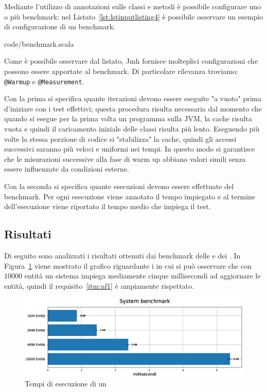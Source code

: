 Mediante l'utilizzo di annotazioni sulle classi e metodi è possibile configurare uno o più benchmark: nel
Listato~\ref{lst:lstinputlisting4} è possibile osservare un esempio di configurazione di un benchmark.


{code/benchmark.scala}

Come è possibile osservare dal listato, Jmh fornisce molteplici configurazioni che possono essere apportate al
benchmark.
Di particolare rilevanza troviamo: \texttt{@Warmup} e \texttt{@Measurement}.

Con la prima si specifica quante iterazioni devono essere eseguite "a vuoto" prima d'iniziare con i test effettivi;
questa procedura risulta necessaria dal momento che quando si esegue per la prima volta un programma sulla JVM, la cache
risulta vuota e quindi il caricamento iniziale delle classi risulta più lento.
Eseguendo più volte la stessa porzione di codice si "stabilizza" la cache, quindi gli accessi successivi saranno più
veloci e uniformi nei tempi.
In questo modo si garantisce che le misurazioni successive alla fase di warm up abbiano valori simili senza essere
influenzate da condizioni esterne.

Con la seconda si specifica quante esecuzioni devono essere effettuate del benchmark.
Per ogni esecuzione viene annotato il tempo impiegato e al termine dell'esecuzione viene riportato il tempo medio che
impiega il test.

\subsection{Risultati}\label{subsec:risultati}
Di seguito sono analizzati i risultati ottenuti dai benchmark delle \View e dei \System.
In Figura~\ref{fig:system} viene mostrato il grafico riguardante i \System in cui si può osservare che con $10000$
entità un sistema impiega mediamente cinque millisecondi ad aggiornare le entità, quindi il requisito~\ref{itm:nf1} è
ampiamente rispettato.

\begin{figure}[H]
    \centering
    \includegraphics[width=\textwidth]{./img/system-benchmark}
    \caption{Tempi di esecuzione di un \System}\label{fig:system}
\end{figure}

